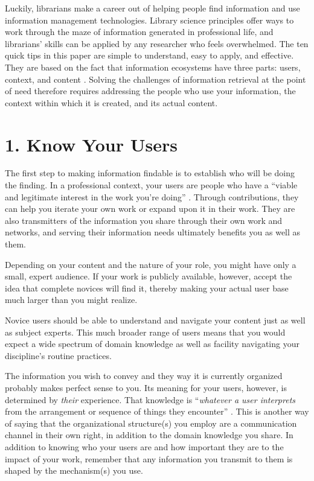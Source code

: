 \documentclass[10pt,letterpaper]{article}
\newcommand{\rulemajor}[1]{\section*{#1}}
\begin{document}
Luckily, librarians make a career out of helping people find information
and use information management technologies. Library science principles
offer ways to work through the maze of information generated in
professional life, and librarians' skills can be applied by any
researcher who feels overwhelmed. The ten quick tips in this paper are
simple to understand, easy to apply, and effective. They are based on
the fact that information ecosystems have three parts: users, context,
and content \cite{Rosenfeld2015}. Solving the challenges of information retrieval at
the point of need therefore requires addressing the people who use your
information, the context within which it is created, and its actual
content.

\rulemajor{1. Know Your Users}

The first step to making information findable is to establish who will
be doing the finding. In a professional context, your users are people
who have a ``viable and legitimate interest in the work you're doing''
\cite{Covert2014}. Through contributions, they can help you iterate your own work
or expand upon it in their work. They are also transmitters of the
information you share through their own work and networks, and serving
their information needs ultimately benefits you as well as them.

Depending on your content and the nature of your role, you might have
only a small, expert audience. If your work is publicly available,
however, accept the idea that complete novices will find it, thereby
making your actual user base much larger than you might realize.

Novice users should be able to understand and navigate your content just
as well as subject experts. This much broader range of users means that
you would expect a wide spectrum of domain knowledge as well as facility
navigating your discipline's routine practices.

The information you wish to convey and they way it is currently
organized probably makes perfect sense to you. Its meaning for your
users, however, is determined by \emph{their} experience. That knowledge
is ``\emph{whatever a user interprets} from the arrangement or sequence
of things they encounter'' \cite{Covert2014}. This is another way of saying that
the organizational structure(s) you employ are a communication channel
in their own right, in addition to the domain knowledge you share. In
addition to knowing who your users are and how important they are to the
impact of your work, remember that any information you transmit to them
is shaped by the mechanism(s) you use.
\end{document}
